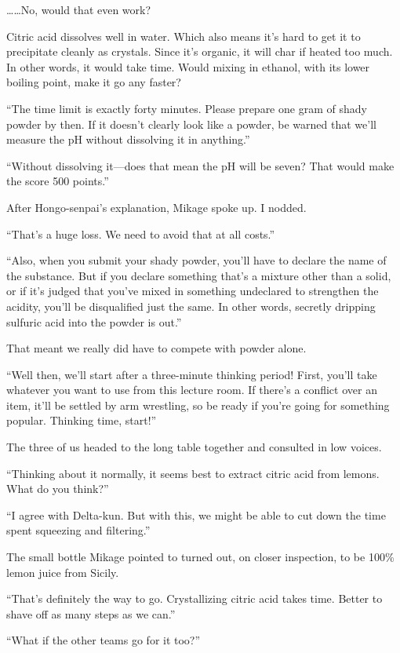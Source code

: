 \documentclass[
    a4paper,
    12pt,
    twoside,
    openany,
    UTF8,
    fontset=windows
]{ctexbook}
\begin{document}
\dots\dots No, would that even work?

Citric acid dissolves well in water. Which also means it's hard to get it to precipitate cleanly as crystals. Since it's organic, it will char if heated too much. In other words, it would take time. Would mixing in ethanol, with its lower boiling point, make it go any faster?

``The time limit is exactly forty minutes. Please prepare one gram of shady powder by then. If it doesn't clearly look like a powder, be warned that we'll measure the pH without dissolving it in anything.''

``Without dissolving it---does that mean the pH will be seven? That would make the score 500 points.''

After Hongo-senpai's explanation, Mikage spoke up. I nodded.

``That's a huge loss. We need to avoid that at all costs.''

``Also, when you submit your shady powder, you'll have to declare the name of the substance. But if you declare something that's a mixture other than a solid, or if it's judged that you've mixed in something undeclared to strengthen the acidity, you'll be disqualified just the same. In other words, secretly dripping sulfuric acid into the powder is out.''

That meant we really did have to compete with powder alone.

``Well then, we'll start after a three-minute thinking period! First, you'll take whatever you want to use from this lecture room. If there's a conflict over an item, it'll be settled by arm wrestling, so be ready if you're going for something popular. Thinking time, start!''

The three of us headed to the long table together and consulted in low voices.

``Thinking about it normally, it seems best to extract citric acid from lemons. What do you think?''

``I agree with Delta-kun. But with this, we might be able to cut down the time spent squeezing and filtering.''

The small bottle Mikage pointed to turned out, on closer inspection, to be 100\% lemon juice from Sicily.

``That's definitely the way to go. Crystallizing citric acid takes time. Better to shave off as many steps as we can.''

``What if the other teams go for it too?''
\end{document}
